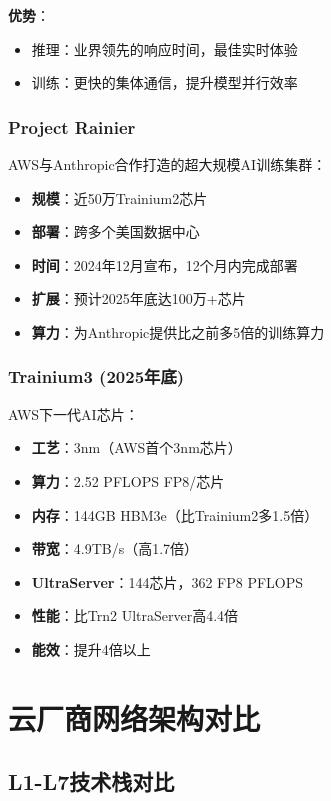 \textbf{优势}：
\begin{itemize}
    \item 推理：业界领先的响应时间，最佳实时体验
    \item 训练：更快的集体通信，提升模型并行效率
\end{itemize}

\subsubsection{Project Rainier}

AWS与Anthropic合作打造的超大规模AI训练集群：

\begin{itemize}
    \item \textbf{规模}：近50万Trainium2芯片
    \item \textbf{部署}：跨多个美国数据中心
    \item \textbf{时间}：2024年12月宣布，12个月内完成部署
    \item \textbf{扩展}：预计2025年底达100万+芯片
    \item \textbf{算力}：为Anthropic提供比之前多5倍的训练算力
\end{itemize}

\subsubsection{Trainium3 (2025年底)}

AWS下一代AI芯片：

\begin{itemize}
    \item \textbf{工艺}：3nm（AWS首个3nm芯片）
    \item \textbf{算力}：2.52 PFLOPS FP8/芯片
    \item \textbf{内存}：144GB HBM3e（比Trainium2多1.5倍）
    \item \textbf{带宽}：4.9TB/s（高1.7倍）
    \item \textbf{UltraServer}：144芯片，362 FP8 PFLOPS
    \item \textbf{性能}：比Trn2 UltraServer高4.4倍
    \item \textbf{能效}：提升4倍以上
\end{itemize}

\section{云厂商网络架构对比}

\subsection{L1-L7技术栈对比}

